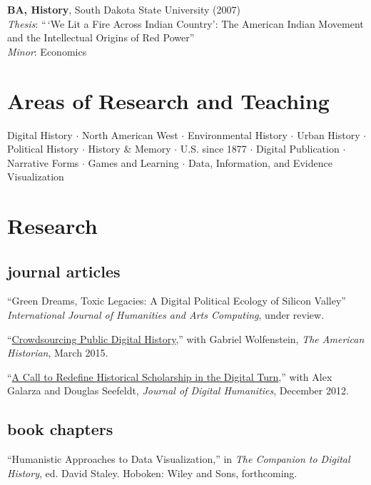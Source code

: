 \textbf{BA, History}, South Dakota State University (2007)\\
\emph{Thesis}: ``\,`We Lit a Fire Across Indian Country': The American
Indian Movement and the Intellectual Origins of Red Power''\\
\emph{Minor}: Economics

\newpage

\section{Areas of Research and
Teaching}\label{areas-of-research-and-teaching}

Digital History \(\cdot\) North American West \(\cdot\) Environmental
History \(\cdot\) Urban History \(\cdot\) Political History \(\cdot\)
History \& Memory \(\cdot\) U.S. since 1877 \(\cdot\) Digital
Publication \(\cdot\) Narrative Forms \(\cdot\) Games and Learning
\(\cdot\) Data, Information, and Evidence Visualization

\section{Research}\label{research}

\subsection{journal articles}\label{journal-articles}

``Green Dreams, Toxic Legacies: A Digital Political Ecology of Silicon
Valley'' \emph{International Journal of Humanities and Arts Computing},
under review.

``\href{http://tah.oah.org/content/crowdsourcing-digital-public-history/}{Crowdsourcing
Public Digital History},'' with Gabriel Wolfenstein, \emph{The American
Historian}, March 2015.

``\href{http://journalofdigitalhumanities.org/1-4/a-call-to-redefine-historical-scholarship-in-the-digital-turn/}{A
Call to Redefine Historical Scholarship in the Digital Turn},'' with
Alex Galarza and Douglas Seefeldt, \emph{Journal of Digital Humanities},
December 2012.

\subsection{book chapters}\label{book-chapters}

``Humanistic Approaches to Data Visualization,'' in \emph{The Companion
to Digital History}, ed. David Staley. Hoboken: Wiley and Sons,
forthcoming.

